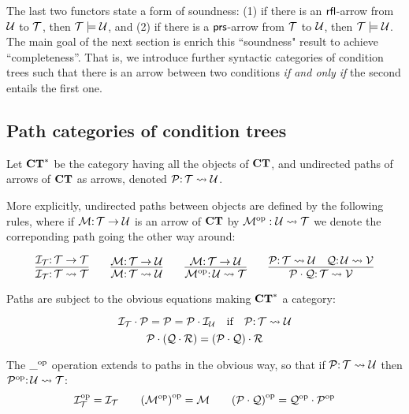 The last two functors state a form of soundness: (1) if there is an ${\mathsf{rfl}}$-arrow from ${\mathcal{U}}$ to ${\mathcal{T}}$, then ${\mathcal{T}} \models {\mathcal{U}}$, and (2)  if there is a ${\mathsf{prs}}$-arrow from ${\mathcal{T}}$ to ${\mathcal{U}}$, then ${\mathcal{T}} \models {\mathcal{U}}$. 
The main goal of the next section is enrich this ``soundness" result to achieve ``completeness''. That is, we introduce further syntactic categories of condition trees such that there is an arrow between two conditions \emph{if and only if} the second entails the first one.

\subsection{Path categories of condition trees}

\begin{definition}
    Let $\mathbf{CT}^*$ be the category having all the objects of $\mathbf{CT}$, and undirected paths of arrows of $\mathbf{CT}$ as arrows, denoted ${\mathcal{P}}{:}\, {\mathcal{T}} \leadsto {\mathcal{U}}$. 

    More explicitly, undirected paths between objects are defined by the following rules, where if ${\mathcal{M}}{:}\, {\mathcal{T}} \rightarrow {\mathcal{U}}$ is an arrow of $\mathbf{CT}$ by ${{\mathcal{M}}}^{\mathrm{op}}: {\mathcal{U}} \leadsto {\mathcal{T}}$ we denote the correponding path going the other way around:



    $$ \infer{\cI_\cT\of \cT \leadsto \cT}{\cI_\cT\of \cT \to \cT} \qquad 
    \infer{\cM \of \cT \leadsto \cU}{\cM \of \cT \to \cU} \qquad 
    \infer{\op{\cM} \of \cU \leadsto \cT}{\cM \of \cT \to \cU}\qquad
    \infer{\cP \cdot \cQ \of \cT \leadsto \cV}{\cP\of \cT \leadsto \cU & \cQ \of \cU \leadsto \cV}$$

    Paths are subject to the obvious equations making $\mathbf{CT}^*$ a category:

    $$ {\mathcal{I}}_{\mathcal{T}} \cdot {\mathcal{P}} = {\mathcal{P}} = {\mathcal{P}} \cdot {\mathcal{I}}_{\mathcal{U}} \mbox{\quad if\quad} {\mathcal{P}}{:}\, {\mathcal{T}} \leadsto {\mathcal{U}}$$
    $${\mathcal{P}} \cdot ({\mathcal{Q}} \cdot {\mathcal{R}}) = ({\mathcal{P}} \cdot {\mathcal{Q}}) \cdot {\mathcal{R}}$$
    
    The ${\_}^{\mathrm{op}}$ operation extends to paths in the obvious way, so that if ${\mathcal{P}}{:}\, {\mathcal{T}} \leadsto {\mathcal{U}}$ then ${{\mathcal{P}}}^{\mathrm{op}}{:}\, {\mathcal{U}} \leadsto {\mathcal{T}}$:
$$ {{\mathcal{I}}}^{\mathrm{op}}_{\mathcal{T}} = {\mathcal{I}}_{\mathcal{T}} \qquad 
{({{\mathcal{M}}}^{\mathrm{op}})}^{\mathrm{op}} = {\mathcal{M}} \qquad {({\mathcal{P}}\cdot {\mathcal{Q}})}^{\mathrm{op}} = {{\mathcal{Q}}}^{\mathrm{op}} \cdot {{\mathcal{P}}}^{\mathrm{op}} $$ 
\end{definition}


